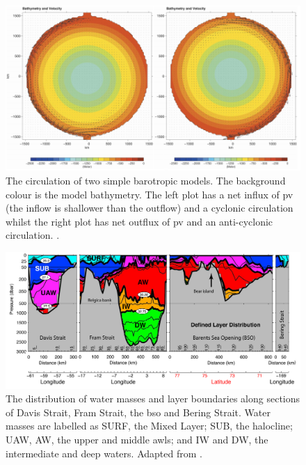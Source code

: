 \documentclass[10pt,a4paper]{article}
\begin{document}
\begin{figure}
	\centering
	\includegraphics[width=\linewidth]{Yang2005}
	\caption[\cite{yang2005arctic}]{ The circulation of two simple barotropic
		models. The background colour is the model bathymetry. The left plot has
		a net influx of \gls{pv} (the inflow is shallower than the outflow) 
		and a cyclonic circulation whilst the right plot has net outflux of  \gls{pv} 
		and an anti-cyclonic circulation. \cite{yang2005arctic}.}
	\label{fig:Yang2005}
\end{figure}


\begin{figure}
	\centering
	\includegraphics[width=\linewidth]{Tsubouchi2012Gateways}
	\caption[Adapted from \cite{tsubouchi2012arctic}]{The distribution of water masses and
		layer boundaries along sections of Davis Strait, Fram Strait, the \gls{bso} and
		Bering Strait. Water masses are labelled as SURF, the Mixed Layer; SUB, the halocline;
		UAW, AW, the upper and middle \glspl{awl}; and IW and DW, the intermediate and deep
		waters.  Adapted from \cite{tsubouchi2012arctic}.}
	\label{fig:Tsubouchi2012Gateways}
\end{figure}
\end{document}
